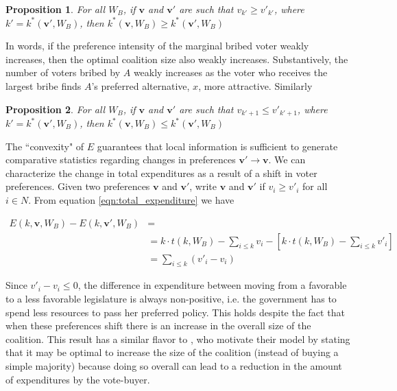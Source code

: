 \documentclass[12pt,a4paper]{article}
\newtheorem{proposition}{Proposition}
\begin{document}
\begin{proposition}
    For all $W_B$, if $\mathbf{v}$ and $\mathbf{v}'$ are such that $v_{k'} \geq v'_{k'}$, where $k' = k^*(\mathbf{v}', W_B)$, then $k^*(\mathbf{v}, W_B) \geq k^*(\mathbf{v}', W_B)$
\end{proposition}

In words, if the preference intensity of the marginal bribed voter weakly increases, then the optimal coalition size also weakly increases. Substantively, the number of voters bribed by $A$ weakly increases as the voter who receives the largest bribe finds $A$'s preferred alternative, $x$, more attractive. Similarly

\begin{proposition}
    For all $W_B$, if $\mathbf{v}$ and $\mathbf{v}'$ are such that $v_{k' + 1} \leq v'_{k' + 1}$, where $k' = k^*(\mathbf{v}', W_B)$, then $k^*(\mathbf{v}, W_B) \leq k^*(\mathbf{v}', W_B)$
\end{proposition}

The ``convexity" of $E$ guarantees that local information is sufficient to generate comparative statistics regarding changes in preferences $\mathbf{v}' \rightarrow \mathbf{v}$. We can characterize the change in total expenditures as a result of a shift in voter preferences. Given two preferences $\mathbf{v}$ and $\mathbf{v}'$, write $\mathbf{v}$ and $\mathbf{v}'$ if $v_i \geq v'_i$ for all $i \in N$. From equation \ref{eqn:total_expenditure} we have

\begin{align*}
    E(k, \mathbf{v}, W_B) - E(k, \mathbf{v}', W_B) & = \\
    &= k \cdot t(k, W_B) - \sum_{i \leq k} v_i - \left[k \cdot t(k, W_B) - \sum_{i \leq k} v'_i\right]\\
    &= \sum_{i \leq k}(v'_i - v_i)
\end{align*}

Since $v'_i - v_i \leq 0$, the difference in expenditure between moving from a favorable to a less favorable legislature is always non-positive, i.e. the government has to spend less resources to pass her preferred policy. This holds despite the fact that when these preferences shift there is an increase in the overall size of the coalition. This result has a similar flavor to \citet{groseclose_1996_buying}, who motivate their model by stating that it may be optimal to increase the size of the coalition (instead of buying a simple majority) because doing so overall can lead to a reduction in the amount of expenditures by the vote-buyer.
\end{document}
